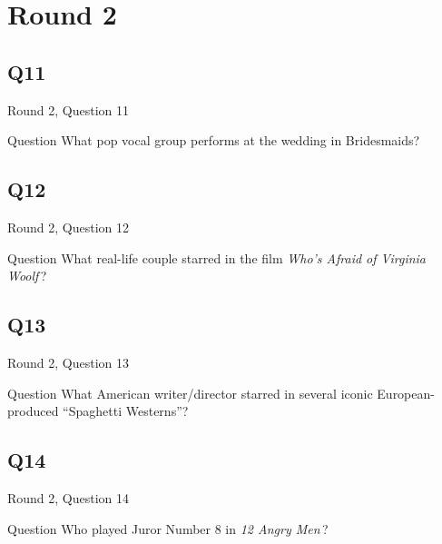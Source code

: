 \documentclass[11pt]{beamer}
\begin{document}
\section{Round 2}
    

\subsection*{Q11}
\begin{frame}[t]{Round 2, Question 11}
\vspace{2em}
\begin{block}{Question}
What pop vocal group performs at the wedding in Bridesmaids?
\end{block}
\end{frame}
    

\subsection*{Q12}
\begin{frame}[t]{Round 2, Question 12}
\vspace{2em}
\begin{block}{Question}
What real-life couple starred in the film \emph{Who's Afraid of Virginia Woolf}\,?
\end{block}
\end{frame}
    

\subsection*{Q13}
\begin{frame}[t]{Round 2, Question 13}
\vspace{2em}
\begin{block}{Question}
What American writer/director starred in several iconic European-produced ``Spaghetti Westerns''?
\end{block}
\end{frame}
    

\subsection*{Q14}
\begin{frame}[t]{Round 2, Question 14}
\vspace{2em}
\begin{block}{Question}
Who played Juror Number 8 in \emph{12 Angry Men}\,?
\end{block}
\end{frame}
    
\end{document}
